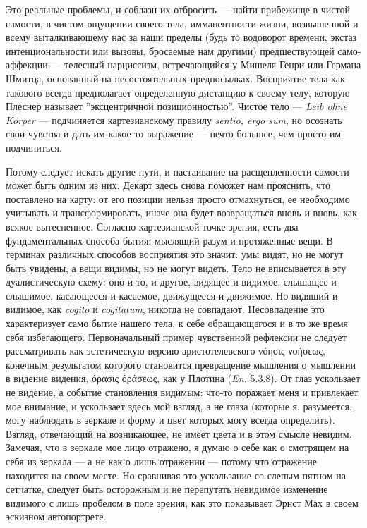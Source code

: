 \documentclass[12pt]{book}
\begin{document}
Это реальные проблемы, и соблазн их отбросить --- найти прибежище в чистой самости, в чистом ощущении своего тела, имманентности жизни, возвышенной и всему выталкивающему нас за наши пределы (будь то водоворот времени, экстаз интенциональности или вызовы, бросаемые нам другими) предшествующей само-аффекции --- телесный нарциссизм, встречающийся у Мишеля Генри или Германа Шмитца, основанный на несостоятельных предпосылках. Восприятие тела как такового всегда предполагает определенную дистанцию к своему телу, которую Плеснер называет ''эксцентричной позиционностью''. Чистое тело --- \textit{Leib ohne Körper} --- подчиняется картезианскому правилу \textit{sentio, ergo sum}, но осознать свои чувства и дать им какое-то выражение --- нечто большее, чем просто им подчиниться.

Потому следует искать другие пути, и настаивание на расщепленности самости может быть одним из них. Декарт здесь снова поможет нам прояснить, что поставлено на карту: от его позиции нельзя просто отмахнуться, ее необходимо учитывать и трансформировать, иначе она будет возвращаться вновь и вновь, как всякое вытесненное. Согласно картезианской точке зрения, есть два фундаментальных способа бытия: мыслящий разум и протяженные вещи. В терминах различных способов восприятия это значит: умы видят, но не могут быть увидены, а вещи видимы, но не могут видеть. Тело не вписывается в эту дуалистическую схему: оно и то, и другое, видящее и видимое, слышащее и слышимое, касающееся и касаемое, движущееся и движимое. Но видящий и видимое, как \textit{cogito} и \textit{cogitatum}, никогда не совпадают. Несовпадение это характеризует само бытие нашего тела, к себе обращающегося и в то же время себя избегающего. Первоначальный пример чувственной рефлексии не следует рассматривать как эстетическую версию аристотелевского νόησις νοήσεως, конечным результатом которого становится превращение мышления о мышлении в видение видения, όρασις όράσεως, как у Плотина (\textit{En.} 5.3.8). От глаз ускользает не видение, а событие становления видимым: что-то поражает меня и привлекает мое внимание, и ускользает здесь мой взгляд, а не глаза (которые я, разумеется, могу наблюдать в зеркале и форму и цвет которых могу всегда определить). Взгляд, отвечающий на возникающее, не имеет цвета и в этом смысле невидим. Замечая, что в зеркале мое лицо отражено, я думаю о себе как о смотрящем на себя из зеркала --- а не как о лишь отражении --- потому что отражение находится на своем месте. Но сравнивая это ускользание со слепым пятном на сетчатке, следует быть осторожным и не перепутать невидимое изменение видимого с лишь пробелом в поле зрения, как это показывает Эрнст Мах в своем эскизном автопортрете.
\end{document}
